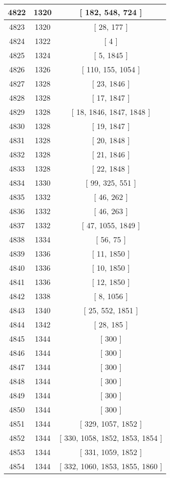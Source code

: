 \begin{center}
\begin{longtable}[H]{|| c c c ||}
\hline
4822 & 1320 & [ 182, 548, 724 ] \\ 
\hline
4823 & 1320 & [ 28, 177 ] \\ 
\hline
4824 & 1322 & [ 4 ] \\ 
\hline
4825 & 1324 & [ 5, 1845 ] \\ 
\hline
4826 & 1326 & [ 110, 155, 1054 ] \\ 
\hline
4827 & 1328 & [ 23, 1846 ] \\ 
\hline
4828 & 1328 & [ 17, 1847 ] \\ 
\hline
4829 & 1328 & [ 18, 1846, 1847, 1848 ] \\ 
\hline
4830 & 1328 & [ 19, 1847 ] \\ 
\hline
4831 & 1328 & [ 20, 1848 ] \\ 
\hline
4832 & 1328 & [ 21, 1846 ] \\ 
\hline
4833 & 1328 & [ 22, 1848 ] \\ 
\hline
4834 & 1330 & [ 99, 325, 551 ] \\ 
\hline
4835 & 1332 & [ 46, 262 ] \\ 
\hline
4836 & 1332 & [ 46, 263 ] \\ 
\hline
4837 & 1332 & [ 47, 1055, 1849 ] \\ 
\hline
4838 & 1334 & [ 56, 75 ] \\ 
\hline
4839 & 1336 & [ 11, 1850 ] \\ 
\hline
4840 & 1336 & [ 10, 1850 ] \\ 
\hline
4841 & 1336 & [ 12, 1850 ] \\ 
\hline
4842 & 1338 & [ 8, 1056 ] \\ 
\hline
4843 & 1340 & [ 25, 552, 1851 ] \\ 
\hline
4844 & 1342 & [ 28, 185 ] \\ 
\hline
4845 & 1344 & [ 300 ] \\ 
\hline
4846 & 1344 & [ 300 ] \\ 
\hline
4847 & 1344 & [ 300 ] \\ 
\hline
4848 & 1344 & [ 300 ] \\ 
\hline
4849 & 1344 & [ 300 ] \\ 
\hline
4850 & 1344 & [ 300 ] \\ 
\hline
4851 & 1344 & [ 329, 1057, 1852 ] \\ 
\hline
4852 & 1344 & [ 330, 1058, 1852, 1853, 1854 ] \\ 
\hline
4853 & 1344 & [ 331, 1059, 1852 ] \\ 
\hline
4854 & 1344 & [ 332, 1060, 1853, 1855, 1860 ] \\ 

\end{longtable}
\end{center}
